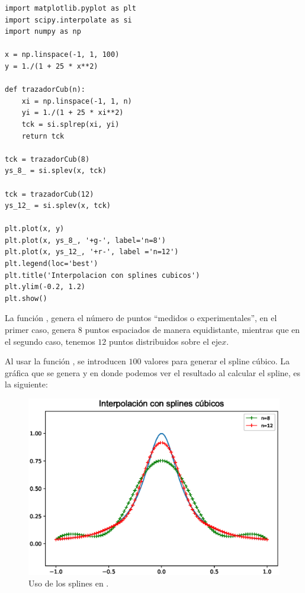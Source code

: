 \begin{lstlisting}[caption=Código para usar un spline, style=FormattedNumber, basicstyle=\linespread{1.1}\ttfamily=\small, columns=fullflexible]
import matplotlib.pyplot as plt
import scipy.interpolate as si
import numpy as np

x = np.linspace(-1, 1, 100)
y = 1./(1 + 25 * x**2)

def trazadorCub(n):
    xi = np.linspace(-1, 1, n)
    yi = 1./(1 + 25 * xi**2)
    tck = si.splrep(xi, yi)
    return tck

tck = trazadorCub(8)
ys_8_ = si.splev(x, tck)

tck = trazadorCub(12)
ys_12_ = si.splev(x, tck)

plt.plot(x, y)
plt.plot(x, ys_8_, '+g-', label='n=8')
plt.plot(x, ys_12_, '+r-', label ='n=12')
plt.legend(loc='best')
plt.title('Interpolacion con splines cubicos')
plt.ylim(-0.2, 1.2)
plt.show()
\end{lstlisting}
La función , genera el número de puntos \enquote{medidos o experimentales}, en el primer caso, genera $8$ puntos espaciados de manera equidistante, mientras que en el segundo caso, tenemos $12$ puntos distribuidos sobre el eje$x$.
\par
Al usar la función , se introducen $100$ valores para generar el spline cúbico. La gráfica que se genera y en donde podemos ver el resultado al calcular el spline, es la siguiente:
\begin{figure}[H]
	\centering
	\includegraphics[scale=0.8]{Imagenes/Funcion_Runge_2017_03.eps}
	\caption{Uso de los splines en \python.}
\end{figure}
